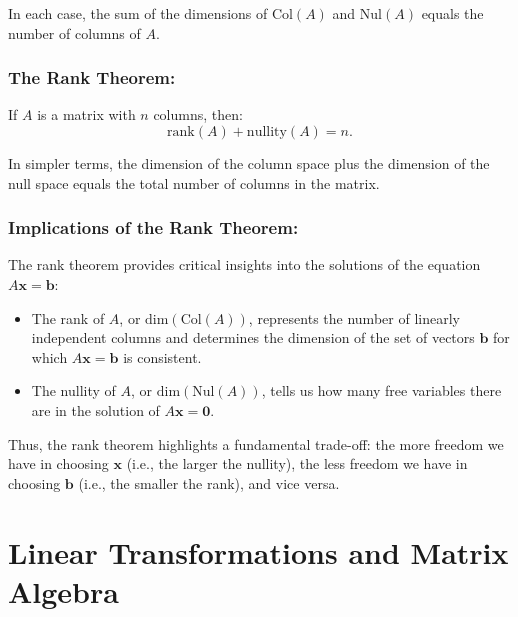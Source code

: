 \documentclass[a4paper,12pt]{article}
\begin{document}
In each case, the sum of the dimensions of \( \text{Col}(A) \) and \( \text{Nul}(A) \) equals the number of columns of \( A \).

\subsubsection{The Rank Theorem:} 
\begin{tcolorbox}[title=Theorem,colframe=blue!70!black, colback=blue!5!white]
If \( A \) is a matrix with \( n \) columns, then:
\[
\text{rank}(A) + \text{nullity}(A) = n.
\]
\end{tcolorbox}

In simpler terms, the dimension of the column space plus the dimension of the null space equals the total number of columns in the matrix.

\subsubsection{Implications of the Rank Theorem:}

\begin{tcolorbox}[title=Definition,colframe=blue!70!black, colback=blue!5!white]
The rank theorem provides critical insights into the solutions of the equation \( A \mathbf{x} = \mathbf{b} \):
\begin{itemize}
    \item The rank of \( A \), or \( \text{dim}(\text{Col}(A)) \), represents the number of linearly independent columns and determines the dimension of the set of vectors \( \mathbf{b} \) for which \( A \mathbf{x} = \mathbf{b} \) is consistent.
    \item The nullity of \( A \), or \( \text{dim}(\text{Nul}(A)) \), tells us how many free variables there are in the solution of \( A \mathbf{x} = \mathbf{0} \).
\end{itemize}
\end{tcolorbox}
Thus, the rank theorem highlights a fundamental trade-off: the more freedom we have in choosing \( \mathbf{x} \) (i.e., the larger the nullity), the less freedom we have in choosing \( \mathbf{b} \) (i.e., the smaller the rank), and vice versa.



\newpage
\Large{\section{Linear Transformations and Matrix Algebra}}
\small
\end{document}

